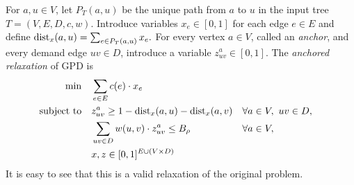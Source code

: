 % 

For $a,u\in V$, let $P_T(a,u)$ be the unique path from $a$ to $u$ in the input tree $T=(V,E,D,c,w)$. Introduce variables $x_e\in[0,1]$ for each edge $e\in E$ and define $
    \text{dist}_x(a,u)=\sum_{e\in P_T(a,u)}x_e.$
For every vertex $a\in V$, called an \emph{anchor}, and every demand edge $uv\in D$, introduce a variable $z^a_{uv}\in[0,1]$. The \emph{anchored relaxation} of GPD is
\begin{equation}\label{lp:tree-anchored}
\begin{aligned}
    \min\quad
        &\sum_{e\in E}c(e)\cdot x_e\\
    \text{subject to}\quad
        &z^a_{uv}\geq1-\text{dist}_x(a,u)-\text{dist}_x(a,v)
            &&\forall a\in V,\ uv\in D,\\
        &\sum_{uv\in D}w(u,v)\cdot z^a_{uv}\leq B_\rho
            &&\forall a\in V,\\
        &x, z \in [0,1]^{E \cup (V \times D)}
\end{aligned}
\end{equation}
It is easy to see that this is a valid relaxation of the original problem.
